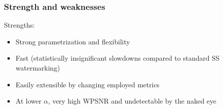 \begin{frame}
    \frametitle{Strength and weaknesses}
    Strengths:

    \begin{itemize}
        \item Strong parametrization and flexibility
        \item Fast (statistically insignificant slowdowns compared to standard SS watermarking)
        \item Easily extensible by changing employed metrics
        \item At lower $\alpha$, very high WPSNR and undetectable by the naked eye
    \end{itemize}
\end{frame}

